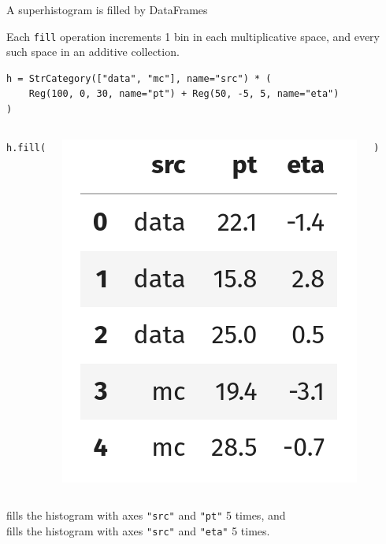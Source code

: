 \documentclass[aspectratio=169]{beamer}
\begin{document}
\begin{frame}[fragile]{A superhistogram is filled by DataFrames}
\vspace{0.25 cm}
\large

Each \texttt{fill} operation increments 1 bin in each multiplicative space, and every such space in an additive collection.

\small
\begin{verbatim}
h = StrCategory(["data", "mc"], name="src") * (
    Reg(100, 0, 30, name="pt") + Reg(50, -5, 5, name="eta")
)
\end{verbatim}

\begin{columns}
\hfill\texttt{h.fill(}

\includegraphics[width=\linewidth]{dataframe.png}

\texttt{)}

\end{columns}

\large
\vspace{0.5 cm}
fills the histogram with axes \texttt{"src"} and \texttt{"pt"} 5 times, and \\ fills the histogram with axes \texttt{"src"} and \texttt{"eta"} 5 times.
\end{frame}
\end{document}
